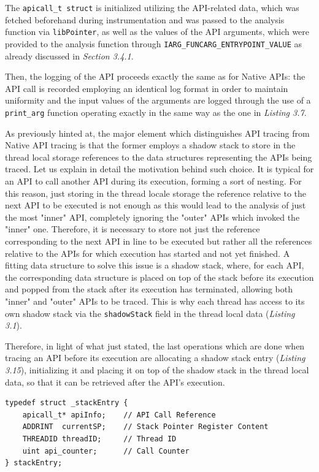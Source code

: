 The \texttt{apicall\_t struct} is initialized utilizing the API-related data, which was fetched beforehand during instrumentation and was passed to the analysis function via \texttt{libPointer}, as well as the values of the API arguments, which were provided to the analysis function through \texttt{IARG\_FUNCARG\_ENTRYPOINT\_VALUE} as already discussed in \textit{Section 3.4.1}.

Then, the logging of the API proceeds exactly the same as for Native APIs: the API call is recorded employing an identical log format in order to maintain uniformity and the input values of the arguments are logged through the use of a \texttt{print\_arg} function operating exactly in the same way as the one in \textit{Listing 3.7}.

As previously hinted at, the major element which distinguishes API tracing from Native API tracing is that the former employs a shadow stack to store in the thread local storage references to the data structures representing the APIs being traced. Let us explain in detail the motivation behind such choice. It is typical for an API to call another API during its execution, forming a sort of nesting. For this reason, just storing in the thread locale storage the reference relative to the next API to be executed is not enough as this would lead to the analysis of just the most "inner" API, completely ignoring the "outer" APIs which invoked the "inner" one. Therefore, it is necessary to store not just the reference corresponding to the next API in line to be executed but rather all the references relative to the APIs for which execution has started and not yet finished. A fitting data structure to solve this issue is a shadow stack, where, for each API, the corresponding data structure is placed on top of the stack before its execution and popped from the stack after its execution has terminated, allowing both "inner" and "outer" APIs to be traced. This is why each thread has access to its own shadow stack via the \texttt{shadowStack} field in the thread local data (\textit{Listing 3.1}).

Therefore, in light of what just stated, the last operations which are done when tracing an API before its execution are allocating a shadow stack entry (\textit{Listing 3.15}), initializing it and placing it on top of the shadow stack in the thread local data, so that it can be retrieved after the API's execution.
\\
\begin{lstlisting}[caption={\texttt{struct} representing a shadow stack entry},captionpos=b]
typedef struct _stackEntry {
	apicall_t* apiInfo;    // API Call Reference
	ADDRINT  currentSP;    // Stack Pointer Register Content
	THREADID threadID;     // Thread ID
	uint api_counter;	   // Call Counter
} stackEntry;
\end{lstlisting}       

